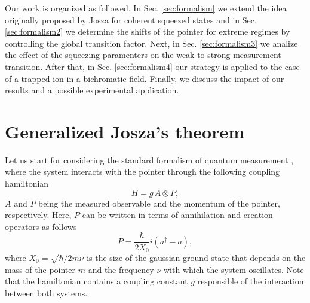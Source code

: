 \documentclass[aps,pra,preprint,superscriptaddress, showpacs]{revtex4-2}
\begin{document}

Our work is organized as followed. In Sec. \ref{sec:formalism} we extend the idea originally proposed by Josza for coherent squeezed states and in Sec. \ref{sec:formalism2} we determine the shifts of the pointer for extreme regimes by controlling the global transition factor. Next, in Sec. \ref{sec:formalism3} we analize the effect of the squeezing paramenters on the weak to strong measurement transition. After that, in Sec. \ref{sec:formalism4} our strategy is applied to the case of a trapped ion in a bichromatic field. Finally, we discuss the impact of our results and a possible experimental application.


\section{\label{sec:formalism}Generalized Josza's theorem}

Let us start for considering the standard formalism of quantum measurement \cite{neumann1955mathematical}, where the system interacts with the pointer through the following coupling hamiltonian
\begin{equation}\label{hamiltonian}
H= g\, A \otimes P,
\end{equation}
$A$ and $P$ being the measured observable and the momentum of the pointer, respectively. Here, $P$ can be written in terms of annihilation and creation operators as follows
\begin{equation}\label{momentum.operator}
P=\frac{\hbar}{2 X_{0}}i\left(a^{\dagger}-a\right),
\end{equation}
where $X_{0}=\sqrt{\hbar/2m\nu}$ is the size of the gaussian ground state that depends on the mass of the pointer $m$ and the frequency $\nu$ with which the system oscillates. Note that the hamiltonian contains a coupling constant $g$ responsible of the interaction between both systems.
\end{document}
